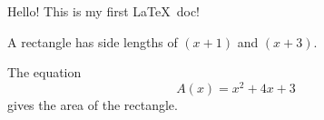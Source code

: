 \documentclass[12pt]{article}
\begin{document}
Hello! This is my first \LaTeX\ doc! 


A rectangle has side lengths of $(x+1)$ and $(x+3)$.

The equation $${A(x) = x^2 + 4x + 3}$$ gives the area of the rectangle.
\end{document}
